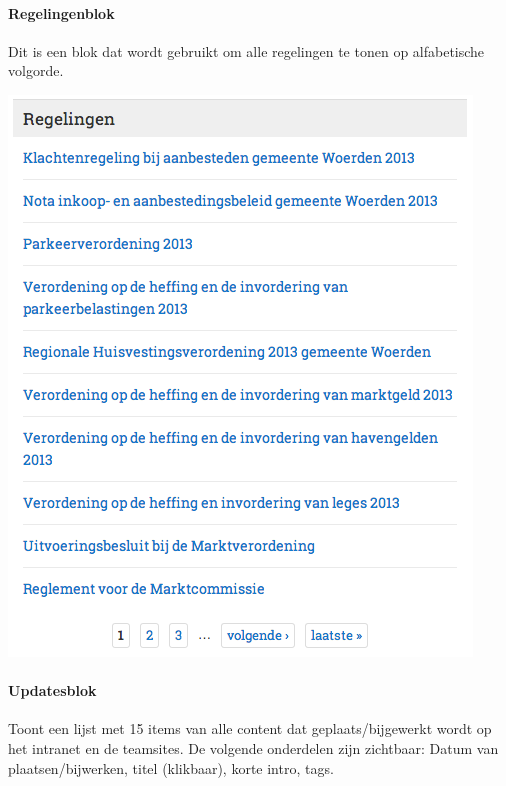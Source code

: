 \paragraph{Regelingenblok}

Dit is een blok dat wordt gebruikt om alle regelingen te tonen op alfabetische volgorde.

\begin{center}
	\includegraphics[scale=0.5]{img/blokken/regelingen.png}
\end{center}

\paragraph{Updatesblok}

Toont een lijst met 15 items van alle content dat geplaats/bijgewerkt wordt op het intranet en de teamsites. De volgende onderdelen zijn zichtbaar: Datum van plaatsen/bijwerken, titel (klikbaar), korte intro, tags.

